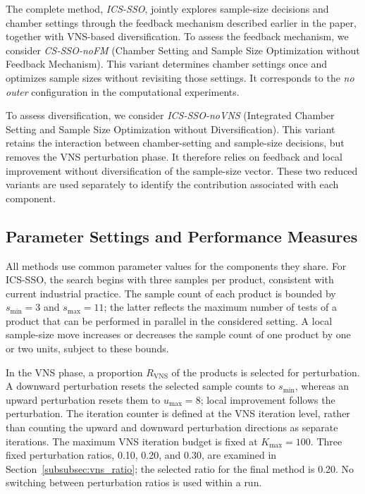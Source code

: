 \documentclass[11pt]{article}
\begin{document}
The complete method, \emph{ICS-SSO}, jointly explores sample-size decisions and chamber settings through the feedback mechanism described earlier in the paper, together with VNS-based diversification. To assess the feedback mechanism, we consider \emph{CS-SSO-noFM} (Chamber Setting and Sample Size Optimization without Feedback Mechanism). This variant determines chamber settings once and optimizes sample sizes without revisiting those settings. It corresponds to the \emph{no outer} configuration in the computational experiments.

To assess diversification, we consider \emph{ICS-SSO-noVNS} (Integrated Chamber Setting and Sample Size Optimization without Diversification). This variant retains the interaction between chamber-setting and sample-size decisions, but removes the VNS perturbation phase. It therefore relies on feedback and local improvement without diversification of the sample-size vector. These two reduced variants are used separately to identify the contribution associated with each component.

\subsection{Parameter Settings and Performance Measures}
\label{subsec:parameter_settings}

All methods use common parameter values for the components they share. For ICS-SSO, the search begins with three samples per product, consistent with current industrial practice. The sample count of each product is bounded by \(s_{\min}=3\) and \(s_{\max}=11\); the latter reflects the maximum number of tests of a product that can be performed in parallel in the considered setting. A local sample-size move increases or decreases the sample count of one product by one or two units, subject to these bounds.

In the VNS phase, a proportion \(R_{\mathrm{VNS}}\) of the products is selected for perturbation. A downward perturbation resets the selected sample counts to \(s_{\min}\), whereas an upward perturbation resets them to \(u_{\max}=8\); local improvement follows the perturbation. The iteration counter is defined at the VNS iteration level, rather than counting the upward and downward perturbation directions as separate iterations. The maximum VNS iteration budget is fixed at \(K_{\max}=100\). Three fixed perturbation ratios, 0.10, 0.20, and 0.30, are examined in Section~\ref{subsubsec:vns_ratio}; the selected ratio for the final method is 0.20. No switching between perturbation ratios is used within a run.
\end{document}
